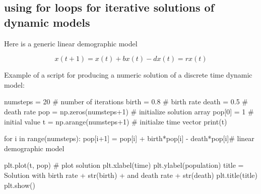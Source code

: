 \documentclass[
  letterpaper,
  DIV=11,
  numbers=noendperiod]{scrreprt}
\newenvironment{Shaded}{\begin{snugshade}}{\end{snugshade}}
\newcommand{\BuiltInTok}[1]{\textcolor[rgb]{0.00,0.23,0.31}{#1}}
\newcommand{\CommentTok}[1]{\textcolor[rgb]{0.37,0.37,0.37}{#1}}
\newcommand{\ControlFlowTok}[1]{\textcolor[rgb]{0.00,0.23,0.31}{#1}}
\newcommand{\DecValTok}[1]{\textcolor[rgb]{0.68,0.00,0.00}{#1}}
\newcommand{\FloatTok}[1]{\textcolor[rgb]{0.68,0.00,0.00}{#1}}
\newcommand{\KeywordTok}[1]{\textcolor[rgb]{0.00,0.23,0.31}{#1}}
\newcommand{\NormalTok}[1]{\textcolor[rgb]{0.00,0.23,0.31}{#1}}
\newcommand{\OperatorTok}[1]{\textcolor[rgb]{0.37,0.37,0.37}{#1}}
\newcommand{\StringTok}[1]{\textcolor[rgb]{0.13,0.47,0.30}{#1}}
\begin{document}
\hypertarget{using-for-loops-for-iterative-solutions-of-dynamic-models}{%
\subsection{using for loops for iterative solutions of dynamic
models}\label{using-for-loops-for-iterative-solutions-of-dynamic-models}}

Here is a generic linear demographic model

\[ 
x(t+1) = x(t) + bx(t) - dx(t) = rx(t)
\]

Example of a script for producing a numeric solution of a discrete time
dynamic model:

\begin{Shaded}
\begin{Highlighting}[]
\NormalTok{numsteps }\OperatorTok{=} \DecValTok{20} \CommentTok{\# number of iterations}
\NormalTok{birth }\OperatorTok{=} \FloatTok{0.8} \CommentTok{\# birth rate}
\NormalTok{death }\OperatorTok{=}  \FloatTok{0.5} \CommentTok{\# death rate}
\NormalTok{pop }\OperatorTok{=}\NormalTok{ np.zeros(numsteps}\OperatorTok{+}\DecValTok{1}\NormalTok{) }\CommentTok{\# initialize solution array}
\NormalTok{pop[}\DecValTok{0}\NormalTok{] }\OperatorTok{=} \DecValTok{1} \CommentTok{\# initial value }
\NormalTok{t }\OperatorTok{=}\NormalTok{ np.arange(numsteps}\OperatorTok{+}\DecValTok{1}\NormalTok{) }\CommentTok{\# initialze time vector}
\BuiltInTok{print}\NormalTok{(t)}

\ControlFlowTok{for}\NormalTok{ i }\KeywordTok{in} \BuiltInTok{range}\NormalTok{(numsteps):}
\NormalTok{     pop[i}\OperatorTok{+}\DecValTok{1}\NormalTok{] }\OperatorTok{=}\NormalTok{ pop[i] }\OperatorTok{+}\NormalTok{ birth}\OperatorTok{*}\NormalTok{pop[i] }\OperatorTok{{-}}\NormalTok{ death}\OperatorTok{*}\NormalTok{pop[i]}\CommentTok{\# linear demographic model}

\NormalTok{plt.plot(t, pop) }\CommentTok{\# plot solution}
\NormalTok{plt.xlabel(}\StringTok{\textquotesingle{}time\textquotesingle{}}\NormalTok{)}
\NormalTok{plt.ylabel(}\StringTok{\textquotesingle{}population\textquotesingle{}}\NormalTok{)}
\NormalTok{title }\OperatorTok{=} \StringTok{\textquotesingle{}Solution with birth rate \textquotesingle{}} \OperatorTok{+} \BuiltInTok{str}\NormalTok{(birth) }\OperatorTok{+} \StringTok{\textquotesingle{} and death rate \textquotesingle{}} \OperatorTok{+} \BuiltInTok{str}\NormalTok{(death)}
\NormalTok{plt.title(title) }
\NormalTok{plt.show()}
\end{Highlighting}
\end{Shaded}
\end{document}
